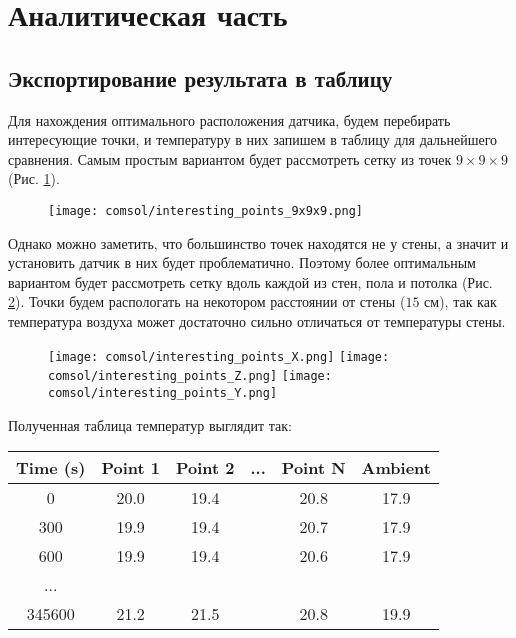 \graphicspath{{./images/algo}}
\section{Аналитическая часть}

\subsection{Экспортирование результата в таблицу}

Для нахождения оптимального расположения датчика, будем перебирать интересующие точки, и температуру в них запишем в таблицу для дальнейшего сравнения. Самым простым вариантом будет рассмотреть сетку из точек $9 \times 9 \times 9$ (Рис. \ref{9x9x9}).

\begin{figure}[H]
\texttt{[image: comsol/interesting\_points\_9x9x9.png]}
\caption{}
\label{9x9x9}
\end{figure}

Однако можно заметить, что большинство точек находятся не у стены, а значит и установить датчик в них будет проблематично. Поэтому более оптимальным вариантом будет рассмотреть сетку вдоль каждой из стен, пола и потолка (Рис. \ref{interesting_points}). Точки будем распологать на некотором расстоянии от стены ($15$ см), так как температура воздуха может достаточно сильно отличаться от температуры стены.

\begin{figure}[H]
\texttt{[image: comsol/interesting\_points\_X.png]}
\texttt{[image: comsol/interesting\_points\_Z.png]}
\texttt{[image: comsol/interesting\_points\_Y.png]}
\caption{}
\label{interesting_points}
\end{figure}

Полученная таблица температур выглядит так:

\begin{table}[H]
\centering
\begin{tabular}{c|c|c|c|c|c}
\textbf{Time (s)} & \textbf{Point 1} & \textbf{Point 2} & ... & \textbf{Point N} & \textbf{Ambient} \\ \hline
0                 & 20.0             & 19.4             &     & 20.8              & 17.9             \\
300               & 19.9             & 19.4             &     & 20.7              & 17.9             \\
600               & 19.9             & 19.4             &     & 20.6              & 17.9             \\
...               &                  &                  &     &                   &                  \\
345600            & 21.2             & 21.5             &     & 20.8              & 19.9            
\end{tabular}
\end{table}

